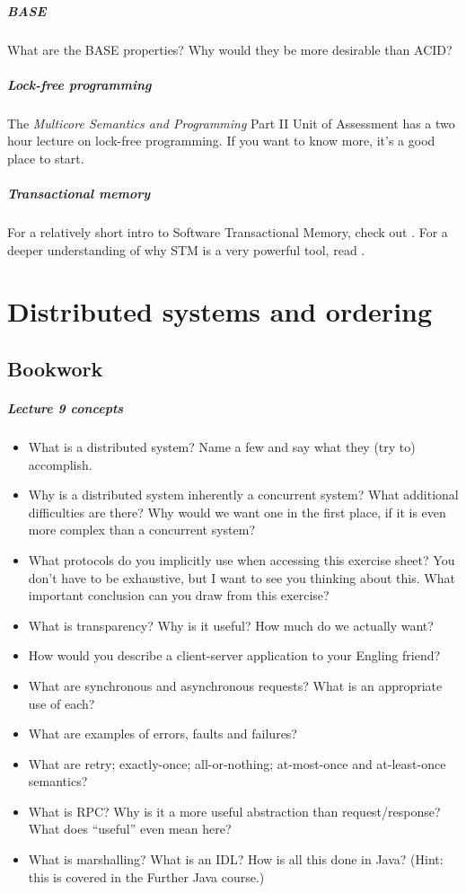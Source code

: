 \documentclass[12pt,a4paper,oneside,openright]{report}
\newcommand{\question}[2]{\paragraph{#1} #2}
\begin{document}
\question{BASE}{What are the BASE properties? Why would they be more
  desirable than ACID?}

\question{Lock-free programming}{The \emph{Multicore Semantics and
    Programming} Part II Unit of Assessment has a two hour lecture on
  lock-free programming. If you want to know more, it's a good place
  to start.}

\question{Transactional memory}{For a relatively short intro to
  Software Transactional Memory, check out
  \cite[Chapter~18]{ArtMultiprocessorProgramming}. For a deeper
  understanding of why STM is a very powerful tool, read \cite{CMT}.}


\chapter{Distributed systems and ordering}

\section{Bookwork}

\question{Lecture 9 concepts}{
  \begin{itemize}
  \item What is a distributed system? Name a few and say what they
    (try to) accomplish.
  \item Why is a distributed system inherently a concurrent system?
    What additional difficulties are there? Why would we want one in
    the first place, if it is even more complex than a concurrent
    system?
  \item What protocols do you implicitly use when accessing this
    exercise sheet? You don't have to be exhaustive, but I want to see
    you thinking about this. What important conclusion can you draw
    from this exercise?
  \item What is transparency? Why is it useful? How much do we
    actually want?
  \item How would you describe a client-server application to your
    Engling friend?
  \item What are synchronous and asynchronous requests? What is an
    appropriate use of each?
  \item What are examples of errors, faults and failures?
  \item What are retry; exactly-once; all-or-nothing; at-most-once and
    at-least-once semantics?
  \item What is RPC? Why is it a more useful abstraction than
    request/response? What does ``useful'' even mean here?
  \item What is marshalling? What is an IDL? How is all this done in
    Java? (Hint: this is covered in the Further Java course.)
  \end{itemize}
}
\end{document}
